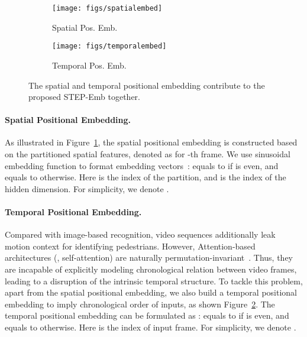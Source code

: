 \documentclass[10pt,twocolumn,letterpaper]{article}
\begin{document}
\begin{figure}
	\centering
	\begin{subfigure}{.23\textwidth}
		\centering
		\texttt{[image: figs/spatialembed]}
		\caption{Spatial Pos. Emb.}
		\label{fig:spatialembed}
	\end{subfigure}
	\begin{subfigure}{.23\textwidth}
		\centering
		\texttt{[image: figs/temporalembed]}
		\caption{Temporal Pos. Emb.}
		\label{fig:temporalembed}
	\end{subfigure}
	\vspace{-1.5mm}
	\caption{The spatial and temporal positional embedding contribute to the proposed STEP-Emb together.}
	\vspace{-2.5mm}
	\label{fig:spembed}
\end{figure}

\vspace{-2mm}
\paragraph{Spatial Positional Embedding.}
As illustrated in Figure~\ref{fig:spatialembed}, the spatial positional embedding is constructed based on the partitioned spatial features, denoted as  for -th frame. We use sinusoidal embedding function to format embedding vectors~\cite{gu2018non,vaswani2017attention}:  equals to  if  is even, and equals to  otherwise. Here  is the index of the partition, and  is the index of the hidden dimension. For simplicity, we denote .

\vspace{-2mm}
\paragraph{Temporal Positional Embedding.}
Compared with image-based recognition, video sequences additionally leak motion context for identifying pedestrians. However, Attention-based architectures (\ie, self-attention) are naturally permutation-invariant~\cite{vaswani2017attention}. Thus, they are incapable of explicitly modeling chronological relation between video frames, leading to a disruption of the intrinsic temporal structure. To tackle this problem, apart from the spatial positional embedding, we also build a temporal positional embedding to imply chronological order of inputs, as shown Figure~\ref{fig:temporalembed}. The temporal positional embedding can be formulated as :  equals to  if  is even, and equals to  otherwise. Here  is the index of input frame. For simplicity, we denote .
\end{document}
